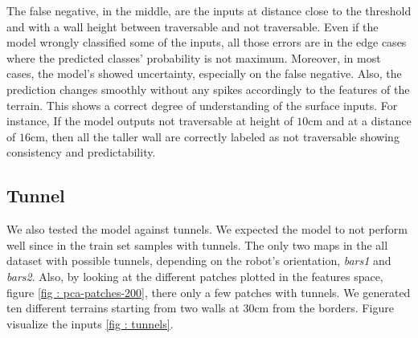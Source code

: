 \documentclass[../document.tex]{subfiles}
\begin{document}
The false negative, in the middle, are the inputs at distance close to the threshold and with a wall height between traversable and not traversable. Even if the model wrongly classified some of the inputs, all those errors are in the edge cases where the predicted classes' probability is not maximum. Moreover, in most cases, the model's showed uncertainty, especially on the false negative. Also, the prediction changes smoothly without any spikes accordingly to the features of the terrain. This shows a correct degree of understanding of the surface inputs. For instance, If the model outputs not traversable at height of $10$cm and at a distance of $16$cm, then all the taller wall are correctly labeled as not traversable showing consistency and predictability. 
\subsection{Tunnel}
We also tested the model against tunnels. We expected the model to not perform well since in the train set samples with tunnels. The only two maps in the all dataset with possible tunnels, depending on the robot's orientation,  \emph{bars1} and \emph{bars2}. Also, by looking at the different patches plotted in the features space, figure \ref{fig : pca-patches-200}, there only a few patches with tunnels. We generated ten different terrains starting from two walls at $30$cm from the borders. Figure visualize the inputs \ref{fig : tunnels}. 
\end{document}
